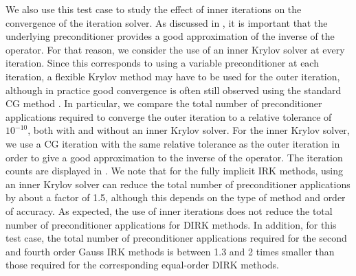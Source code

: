 \documentclass[review]{siamart}
\begin{document}
We also use this test case to study the effect of inner iterations on the convergence of the iteration solver.
As discussed in , it is important that the underlying preconditioner provides a good approximation of the inverse of the operator.
For that reason, we consider the use of an inner Krylov solver at every iteration.
Since this corresponds to using a variable preconditioner at each iteration, a flexible Krylov method may have to be used for the outer iteration, although in practice good convergence is often still observed using the standard CG method \cite{Notay2000}.
In particular, we compare the total number of preconditioner applications required to converge the outer iteration to a relative tolerance of $10^{-10}$, both with and without an inner Krylov solver.
For the inner Krylov solver, we use a CG iteration with the same relative tolerance as the outer iteration in order to give a good approximation to the inverse of the operator.
The iteration counts are displayed in .
We note that for the fully implicit IRK methods, using an inner Krylov solver can reduce the total number of preconditioner applications by about a factor of 1.5, although this depends on the type of method and order of accuracy.
As expected, the use of inner iterations does not reduce the total number of preconditioner applications for DIRK methods.
In addition, for this test case, the total number of preconditioner applications required for the second and fourth order Gauss IRK methods is between 1.3 and 2 times smaller than those required for the corresponding equal-order DIRK methods.
\end{document}
